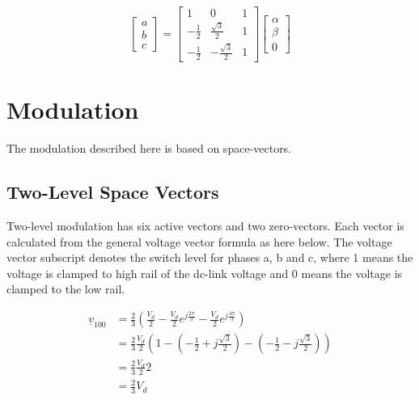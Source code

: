 \documentclass[]{book}
\begin{document}
\[
\begin{bmatrix} a\\ b \\ c \end{bmatrix}
= \begin{bmatrix} 1 & 0 & 1 \\ -\frac{1}{2} & \frac{\sqrt{3}}{2} & 1 \\ -\frac{1}{2} & -\frac{\sqrt{3}}{2} & 1 \end{bmatrix}
\begin{bmatrix} \alpha\\ \beta \\ 0 \end{bmatrix}
\label{eq:trans4}
\]

\hypertarget{modulation}{%
\chapter{Modulation}\label{modulation}}

The modulation described here is based on space-vectors.

\hypertarget{two-level-space-vectors}{%
\section{Two-Level Space Vectors}\label{two-level-space-vectors}}

Two-level modulation has six active vectors and two zero-vectors. Each vector is calculated from the general voltage vector formula as here below. The voltage vector subscript denotes the switch level for phases a, b and c, where 1 means the voltage is clamped to high rail of the dc-link voltage and 0 means the voltage is clamped to the low rail.

\[
\begin{aligned}
\underline{v}_{100} 
& = \frac{2}{3} \left( \frac{V_d}{2} - \frac{V_d}{2} e^{j \frac{2 \pi}{3}}- \frac{V_d}{2} e^{j \frac{4 \pi}{3}} \right)\\
& = \frac{2}{3} \frac{V_d}{2} \left( 1-  (- \frac{1}{2}+j\frac{\sqrt{3}}{2}) - (- \frac{1}{2}-j\frac{\sqrt{3}}{2}) \right)\\
& = \frac{2}{3} \frac{V_d}{2} 2\\
& = \frac{2}{3} V_d\\
\end{aligned}
\]
\end{document}
